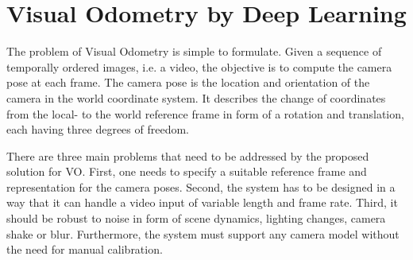 		
		
		
		
		
		
		
	\section{Visual Odometry by Deep Learning}
		
		The problem of Visual Odometry is simple to formulate.
		Given a sequence of temporally ordered images, i.e. a video, the objective is to compute the camera pose at each frame.
		The camera pose is the location and orientation of the camera in the world coordinate system.
		It describes the change of coordinates from the local- to the world reference frame in form of a rotation and translation, each having three degrees of freedom.

		There are three main problems that need to be addressed by the proposed solution for VO.
		First, one needs to specify a suitable reference frame and representation for the camera poses.
		Second, the system has to be designed in a way that it can handle a video input of variable length and frame rate.
		Third, it should be robust to noise in form of scene dynamics, lighting changes, camera shake or blur.
		Furthermore, the system must support any camera model without the need for manual calibration.
		
